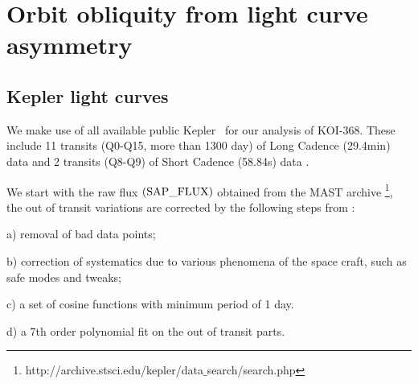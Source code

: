 \documentclass[iop]{emulateapj}
\begin{document}

\section{Orbit obliquity from light curve asymmetry}
\label{sec:transit-light-curve}

\subsection{Kepler light curves}
\label{sec:light curve-model}

We make use of all available public Kepler \lcs\ for our analysis of KOI-368. These include 
11 transits (Q0-Q15, more than 1300 day) of Long Cadence (29.4min) data and 2
transits (Q8-Q9) of Short Cadence (58.84s) data .

We start with the raw flux $(\rm SAP\_FLUX)$ obtained from the MAST archive
\footnote{http://archive.stsci.edu/kepler/data$\_$search/search.php}, the out 
of transit variations are corrected by the following steps from 
\citet{Huang:2013}:

a) removal of bad data points;

b) correction of systematics due to various phenomena of the space craft, such as safe modes and tweaks;

c) a set of cosine functions with minimum period of 1 day. 

d) a 7th order polynomial fit on the out of transit parts. 
\end{document}

